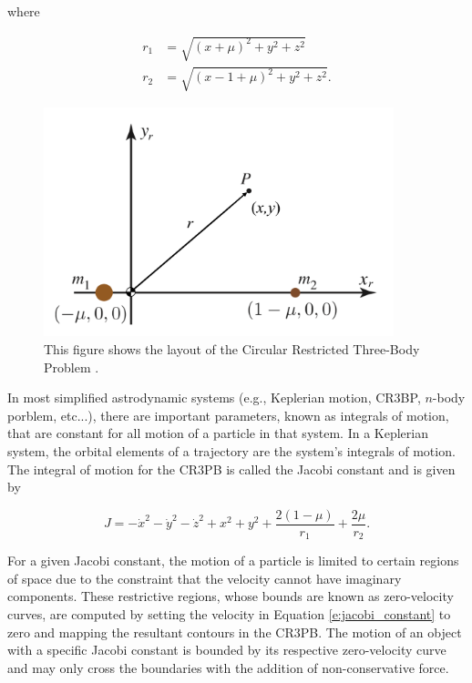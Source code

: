 \documentclass[11pt]{article} %
\begin{document}
\noindent
where

\begin{align}
	r_1 & = \sqrt{\left(x + \mu\right)^2 + y^2 + z^2} \\
	r_2 & = \sqrt{\left(x - 1 + \mu\right)^2 + y^2 + z^2}.
\end{align}

\begin{figure}[H]
	\centering
	\includegraphics[width=4in]{CR3BP.png}\nonumber
	\caption{This figure shows the layout of the Circular Restricted Three-Body Problem \cite{KoonLoMarsdenRoss2011}.}
	\label{f:CR3BP}
\end{figure}

In most simplified astrodynamic systems (e.g., Keplerian motion, CR3BP, $n$-body porblem, etc...), there are important parameters, known as integrals of motion, that are constant for all motion of a particle in that system. In a Keplerian system, the orbital elements of a trajectory are the system's integrals of motion. The integral of motion for the CR3PB is called the Jacobi constant and is given by 

\begin{equation}
	J = -\dot{x}^2-\dot{y}^2-\dot{z}^2+x^2+y^2 + \frac{2\left(1-\mu\right)}{r_1} + \frac{2\mu}{r_2}.
	\label{e:jacobi_constant}
\end{equation}

\noindent
For a given Jacobi constant, the motion of a particle is limited to certain regions of space due to the constraint that the velocity cannot have imaginary components. These restrictive regions, whose bounds are known as zero-velocity curves, are computed by setting the velocity in Equation \ref{e:jacobi_constant} to zero and mapping the resultant contours in the CR3PB. The motion of an object with a specific Jacobi constant is bounded by its respective zero-velocity curve and may only cross the boundaries with the addition of non-conservative force.
\end{document}
